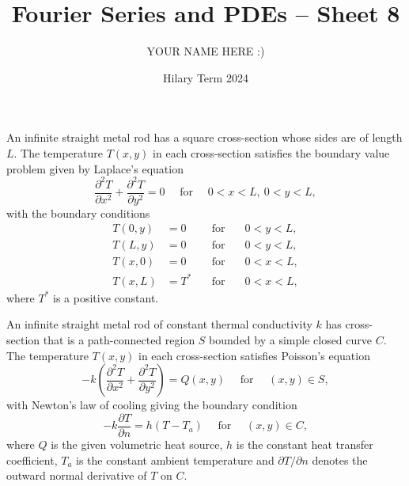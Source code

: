 \documentclass[answers]{exam}
\title{Fourier Series and PDEs -- Sheet 8}
\author{YOUR NAME HERE :)}
\date{Hilary Term 2024}
\begin{document}
\maketitle
\begin{questions}

\question%
An infinite straight metal rod has a square cross-section whose sides are of length $L$. The temperature $T(x, y)$ in each cross-section satisfies the boundary value problem given by Laplace's equation \[
	\frac{\partial^{2} T}{\partial x^{2}}+\frac{\partial^{2} T}{\partial y^{2}}=0 \quad \text { for } \quad 0<x<L,~0<y<L,
\] with the boundary conditions \[
	\begin{array}{clcl}
		T(0, y)&\!\!\!\!=0 &\quad \text {for} &\quad 0<y<L, \\
		T(L, y)&\!\!\!\!=0 &\quad \text {for} &\quad 0<y<L, \\
		T(x, 0)&\!\!\!\!=0 &\quad \text {for} &\quad 0<x<L, \\
		T(x, L)&\!\!\!\!=T^{*} &\quad \text {for} &\quad 0<x<L,
	\end{array}
\] where $T^{*}$ is a positive constant.



\question%
An infinite straight metal rod of constant thermal conductivity $k$ has cross-section that is a path-connected region $S$ bounded by a simple closed curve $C$. The temperature $T(x, y)$ in each cross-section satisfies Poisson's equation \[
	-k\left(\frac{\partial^{2} T}{\partial x^{2}}+\frac{\partial^{2} T}{\partial y^{2}}\right)=Q(x, y) \quad \text { for } \quad(x, y) \in S,
\] with Newton's law of cooling giving the boundary condition \[
	-k \frac{\partial T}{\partial n}=h\left(T-T_{a}\right) \quad \text { for } \quad(x, y) \in C,
\] where $Q$ is the given volumetric heat source, $h$ is the constant heat transfer coefficient, $T_{a}$ is the constant ambient temperature and $\partial T / \partial n$ denotes the outward normal derivative of $T$ on $C$.
\begin{parts}

\end{parts}
\end{questions}
\end{document}
